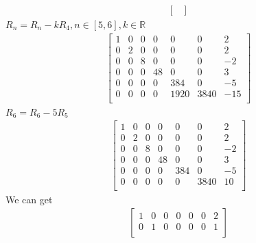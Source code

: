 \documentclass{article}
\begin{document}
{\begin{equation*}
\begin{split}
\begin{bmatrix}
                        \end{bmatrix}
                    \end{split}
                \end{equation*}
                $R_n=R_n-kR_4,n\in[5,6],k\in \mathbb{R}$
                \begin{equation*}
                    \begin{split}
                        \begin{bmatrix}
                            1&0&0&0&0&0&2\\
                            0&2&0&0&0&0&2\\
                            0&0&8&0&0&0&-2\\
                            0&0&0&48&0&0&3\\
                            0&0&0&0&384&0&-5\\
                            0&0&0&0&1920&3840&-15\\
                        \end{bmatrix}
                    \end{split}
                \end{equation*}
                $R_6=R_6-5R_5$
                \begin{equation*}
                    \begin{split}
                        \begin{bmatrix}
                            1&0&0&0&0&0&2\\
                            0&2&0&0&0&0&2\\
                            0&0&8&0&0&0&-2\\
                            0&0&0&48&0&0&3\\
                            0&0&0&0&384&0&-5\\
                            0&0&0&0&0&3840&10\\
                        \end{bmatrix}
                    \end{split}
                \end{equation*}
                We can get
                \begin{equation*}
                    \begin{split}
                        \begin{bmatrix}
                            1&0&0&0&0&0&2\\
                            0&1&0&0&0&0&1\\

\end{bmatrix}
\end{split}
\end{equation*}}
\end{document}
